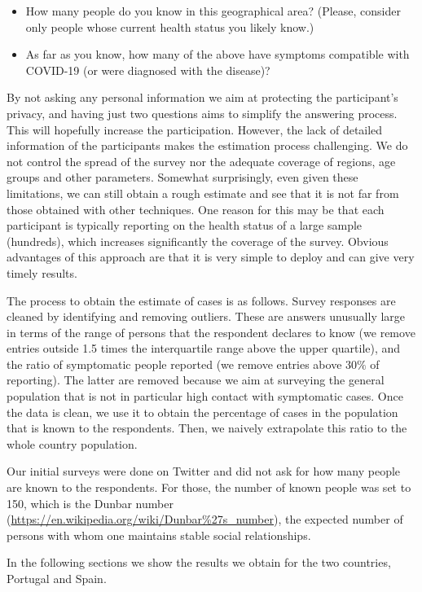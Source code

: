 \documentclass{article}
\begin{document}
\begin{itemize}
\item How many people do you know in this geographical area? (Please, consider only people whose current health status you likely know.)
\item As far as you know, how many of the above have symptoms compatible with COVID-19 (or were diagnosed with the disease)?
\end{itemize}

By not asking any personal information we aim at protecting the participant's privacy, and having just two questions aims to simplify the answering process. This will hopefully increase the participation. However, the lack of detailed information of the participants makes the estimation process challenging. We do not control the spread of the survey nor the adequate coverage of regions, age groups and other parameters. Somewhat surprisingly, even given these limitations, we can still obtain a rough estimate and see that it is not far from those obtained with other techniques. One reason for this may be that each participant is typically reporting on the health status of a large sample (hundreds), which increases significantly the coverage of the survey. Obvious advantages of this approach are that it is very simple to deploy and can give very timely results.

The process to obtain the estimate of cases is as follows.
Survey responses are cleaned by identifying and removing outliers. These are answers unusually large in terms of the range of persons that the respondent declares to know (we remove entries outside 1.5 times the interquartile range above the upper quartile), and the ratio of symptomatic people reported (we remove entries above $30\%$ of reporting). The latter are removed because we aim at surveying the general population that is not in particular high contact with symptomatic cases. Once the data is clean, we use it to obtain the percentage of cases in the population that is known to the respondents. Then, we naively extrapolate this ratio to the whole country population.

Our initial surveys were done on Twitter and did not ask for how many people are known to the respondents. For those, the number of known people was set to 150, which is the Dunbar number (\url{https://en.wikipedia.org/wiki/Dunbar%27s_number}), the expected number of persons with whom one maintains stable social relationships. 

In the following sections we show the results we obtain for the two countries, Portugal and Spain. 
\end{document}
